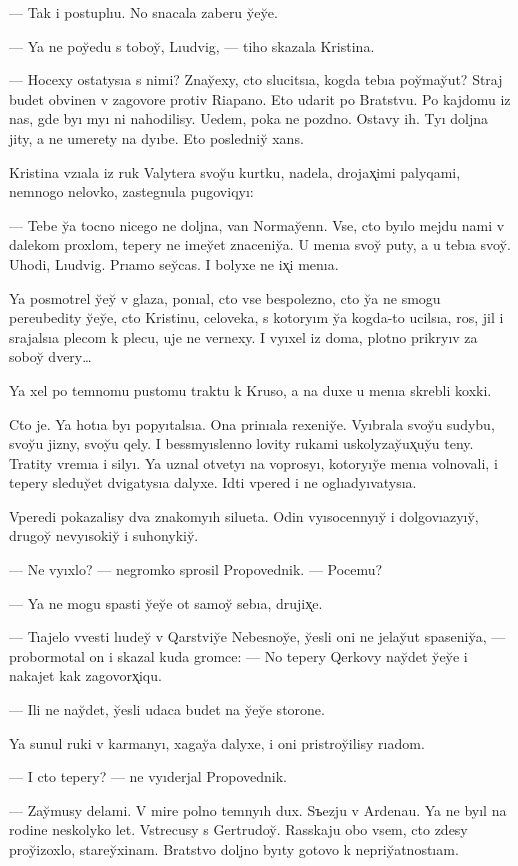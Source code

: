 \documentclass[10pt]{book}
\begin{document}
— Tak i postuplıu. No snacala zaberu y̆ey̆e.

— Ya ne poy̆edu s toboy̆, Lıudvig, — tiho skazala Kristina.

— Hocexy ostatysıa s nimi? Znay̆exy, cto slucitsıa, kogda tebıa poy̆may̆ut? Straj budet obvinen v zagovore protiv Riapano. Eto udarit po Bratstvu. Po kajdomu iz nas, gde byı myı ni nahodilisy. Uedem, poka ne pozdno. Ostavy ih. Tyı doljna jity, a ne umerety na dyıbe. Eto posledniy̆ xans.

Kristina vzıala iz ruk Valytera svoy̆u kurtku, nadela, drojax̨imi palyqami, nemnogo nelovko, zastegnula pugoviqyı:

— Tebe y̆a tocno nicego ne doljna, van Normay̆enn. Vse, cto byılo mejdu nami v dalekom proxlom, tepery ne imey̆et znaceniy̆a. U menıa svoy̆ puty, a u tebıa svoy̆. Uhodi, Lıudvig. Prıamo sey̆cas. I bolyxe ne ix̨i menıa.

Ya posmotrel y̆ey̆ v glaza, ponıal, cto vse bespolezno, cto y̆a ne smogu pereubedity y̆ey̆e, cto Kristinu, celoveka, s kotoryım y̆a kogda-to ucilsıa, ros, jil i srajalsıa plecom k plecu, uje ne vernexy. I vyıxel iz doma, plotno prikryıv za soboy̆ dvery…

Ya xel po temnomu pustomu traktu k Kruso, a na duxe u menıa skrebli koxki.

Cto je. Ya hotıa byı popyıtalsıa. Ona prinıala rexeniy̆e. Vyıbrala svoy̆u sudybu, svoy̆u jizny, svoy̆u qely. I bessmyıslenno lovity rukami uskolyzay̆ux̨uy̆u teny. Tratity vremıa i silyı. Ya uznal otvetyı na voprosyı, kotoryıy̆e menıa volnovali, i tepery sleduy̆et dvigatysıa dalyxe. Idti vpered i ne oglıadyıvatysıa.

Vperedi pokazalisy dva znakomyıh silueta. Odin vyısocennyıy̆ i dolgovıazyıy̆, drugoy̆ nevyısokiy̆ i suhonykiy̆.

— Ne vyıxlo? — negromko sprosil Propovednik. — Pocemu?

— Ya ne mogu spasti y̆ey̆e ot samoy̆ sebıa, drujix̨e.

— Tıajelo vvesti lıudey̆ v Qarstviy̆e Nebesnoy̆e, y̆esli oni ne jelay̆ut spaseniy̆a, — probormotal on i skazal kuda gromce: — No tepery Qerkovy nay̆det y̆ey̆e i nakajet kak zagovorx̨iqu.

— Ili ne nay̆det, y̆esli udaca budet na y̆ey̆e storone.

Ya sunul ruki v karmanyı, xagay̆a dalyxe, i oni pristroy̆ilisy rıadom.

— I cto tepery? — ne vyıderjal Propovednik.

— Zay̆musy delami. V mire polno temnyıh dux. Sъezju v Ardenau. Ya ne byıl na rodine neskolyko let. Vstrecusy s Gertrudoy̆. Rasskaju obo vsem, cto zdesy proy̆izoxlo, starey̆xinam. Bratstvo doljno byıty gotovo k nepriy̆atnostıam.
\end{document}
